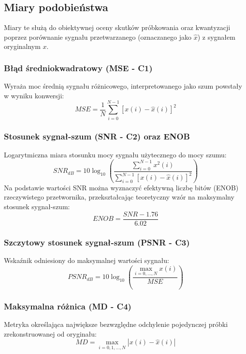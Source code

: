 \documentclass[12pt]{article}
\begin{document}
\subsection{Miary podobieństwa}
Miary te służą do obiektywnej oceny skutków próbkowania oraz kwantyzacji poprzez porównanie sygnału przetwarzanego (oznaczanego jako $\hat{x}$) z sygnałem oryginalnym $x$.

\subsubsection*{Błąd średniokwadratowy (MSE - C1)}
Wyraża moc średnią sygnału różnicowego, interpretowanego jako szum powstały w wyniku konwersji:
\begin{equation}
	MSE = \frac{1}{N} \sum_{i=0}^{N-1} [x(i) - \hat{x}(i)]^2
\end{equation}

\subsubsection*{Stosunek sygnał-szum (SNR - C2) oraz ENOB}
Logarytmiczna miara stosunku mocy sygnału użytecznego do mocy szumu:
\begin{equation}
	SNR_{dB} = 10 \log_{10} \left( \frac{\sum_{i=0}^{N-1} x^2(i)}{\sum_{i=0}^{N-1} [x(i) - \hat{x}(i)]^2} \right)
\end{equation}
Na podstawie wartości SNR można wyznaczyć efektywną liczbę bitów (ENOB) rzeczywistego przetwornika, przekształcając teoretyczny wzór na maksymalny stosunek sygnał-szum:
\begin{equation}
	ENOB = \frac{SNR - 1.76}{6.02}
\end{equation}

\subsubsection*{Szczytowy stosunek sygnał-szum (PSNR - C3)}
Wskaźnik odniesiony do maksymalnej wartości sygnału:
\begin{equation}
	PSNR_{dB} = 10 \log_{10} \left( \frac{\max_{i=0,\dots,N} x(i)}{MSE} \right)
\end{equation}

\subsubsection*{Maksymalna różnica (MD - C4)}
Metryka określająca największe bezwzględne odchylenie pojedynczej próbki zrekonstruowanej od oryginału:
\begin{equation}
	MD = \max_{i=0,1,\dots,N} |x(i) - \hat{x}(i)|
\end{equation}
\end{document}
